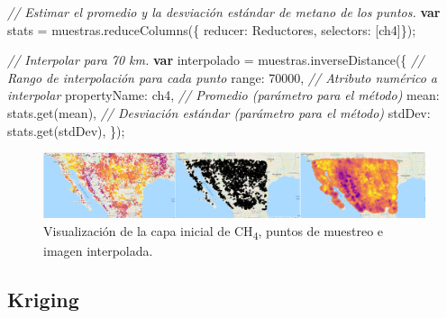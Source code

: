 \documentclass[
  12pt,
  letterpaper,
  twoside]{book}
\newenvironment{Shaded}{\begin{snugshade}}{\end{snugshade}}
\newcommand{\CommentTok}[1]{\textcolor[rgb]{0.24,0.58,0.00}{\textit{#1}}}
\newcommand{\ControlFlowTok}[1]{\textcolor[rgb]{0.00,0.00,0.00}{\textbf{#1}}}
\newcommand{\DataTypeTok}[1]{\textcolor[rgb]{0.00,0.00,0.00}{#1}}
\newcommand{\DecValTok}[1]{\textcolor[rgb]{0.28,0.53,0.93}{#1}}
\newcommand{\FunctionTok}[1]{\textcolor[rgb]{0.48,0.12,0.64}{#1}}
\newcommand{\NormalTok}[1]{#1}
\newcommand{\OperatorTok}[1]{\textcolor[rgb]{0.00,0.00,0.00}{#1}}
\newcommand{\StringTok}[1]{\textcolor[rgb]{0.87,0.29,0.22}{#1}}
\begin{document}
\begin{Shaded}
\begin{Highlighting}[]
\CommentTok{// Estimar el promedio y la desviación estándar de metano de los puntos.}
\ControlFlowTok{var}\NormalTok{ stats }\OperatorTok{=}\NormalTok{ muestras}\OperatorTok{.}\FunctionTok{reduceColumns}\NormalTok{(\{}
  \DataTypeTok{reducer}\OperatorTok{:}\NormalTok{ Reductores}\OperatorTok{,}
  \DataTypeTok{selectors}\OperatorTok{:}\NormalTok{ [}\StringTok{\textquotesingle{}ch4\textquotesingle{}}\NormalTok{]\})}\OperatorTok{;}

\CommentTok{// Interpolar para 70 km.}
\ControlFlowTok{var}\NormalTok{ interpolado }\OperatorTok{=}\NormalTok{ muestras}\OperatorTok{.}\FunctionTok{inverseDistance}\NormalTok{(\{}
  \CommentTok{// Rango de interpolación para cada punto}
  \DataTypeTok{range}\OperatorTok{:} \DecValTok{70000}\OperatorTok{,} 
  \CommentTok{// Atributo numérico a interpolar}
  \DataTypeTok{propertyName}\OperatorTok{:} \StringTok{\textquotesingle{}ch4\textquotesingle{}}\OperatorTok{,} 
  \CommentTok{// Promedio (parámetro para el método)}
  \DataTypeTok{mean}\OperatorTok{:}\NormalTok{ stats}\OperatorTok{.}\FunctionTok{get}\NormalTok{(}\StringTok{\textquotesingle{}mean\textquotesingle{}}\NormalTok{)}\OperatorTok{,} 
  \CommentTok{// Desviación estándar (parámetro para el método)}
  \DataTypeTok{stdDev}\OperatorTok{:}\NormalTok{ stats}\OperatorTok{.}\FunctionTok{get}\NormalTok{(}\StringTok{\textquotesingle{}stdDev\textquotesingle{}}\NormalTok{)}\OperatorTok{,} 
\NormalTok{  \})}\OperatorTok{;} 
\end{Highlighting}
\end{Shaded}



\begin{figure}[H]

{\centering \includegraphics[width=0.95\linewidth]{Img/interpol} 

}

\caption{Visualización de la capa inicial de CH\textsubscript{4}, puntos de muestreo e imagen interpolada.}\label{fig:fc113}
\end{figure}

\hypertarget{kriging}{%
\subsection*{Kriging}\label{kriging}}
\end{document}

